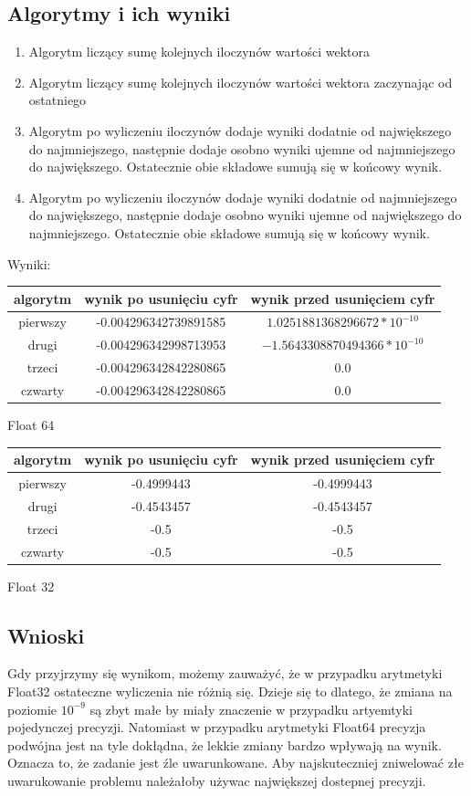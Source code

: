 \documentclass{article}
\begin{document}
\subsection{Algorytmy i ich wyniki}
\begin{enumerate}
  \item Algorytm liczący sumę kolejnych iloczynów wartości wektora
  \item Algorytm liczący sumę kolejnych iloczynów wartości wektora zaczynając od ostatniego
  \item Algorytm po wyliczeniu iloczynów dodaje wyniki dodatnie od największego do najmniejszego, następnie dodaje osobno wyniki ujemne od najmniejszego do największego. Ostatecznie obie składowe sumują się w końcowy wynik.
  \item Algorytm po wyliczeniu iloczynów dodaje wyniki dodatnie od najmniejszego do największego, następnie dodaje osobno wyniki ujemne od największego do najmniejszego. Ostatecznie obie składowe sumują się w końcowy wynik.
\end{enumerate}
Wyniki:
\begin{center}
  \begin{tabular}{c|c|c}
    algorytm & wynik po usunięciu cyfr & wynik przed usunięciem cyfr\\
    \hline
    pierwszy & -0.004296342739891585 & $1.0251881368296672 * 10^{-10}$\\
    drugi & -0.004296342998713953 & $-1.5643308870494366 * 10^{-10}$\\
    trzeci & -0.004296342842280865 & 0.0\\
    czwarty & -0.004296342842280865 & 0.0
  \end{tabular} \par
  \bigskip
  Float 64
\end{center}
\begin{center}
  \begin{tabular}{c|c|c}
    algorytm & wynik po usunięciu cyfr & wynik przed usunięciem cyfr\\
    \hline
    pierwszy & -0.4999443 & -0.4999443\\
    drugi & -0.4543457 & -0.4543457\\
    trzeci & -0.5 & -0.5\\
    czwarty & -0.5 & -0.5
  \end{tabular} \par
  \bigskip
  Float 32
\end{center}

\subsection{Wnioski}
Gdy przyjrzymy się wynikom, możemy zauważyć, że w przypadku arytmetyki Float32 ostateczne wyliczenia nie różnią się. Dzieje się to dlatego, że zmiana na poziomie $10^{-9}$ są zbyt małe by miały znaczenie w przypadku artyemtyki pojedynczej precyzji. Natomiast w przypadku arytmetyki Float64 precyzja podwójna jest na tyle dokłądna, że lekkie zmiany bardzo wpływają na wynik. Oznacza to, że zadanie jest źle uwarunkowane. Aby najskuteczniej zniwelować złe uwarukowanie problemu należałoby używac największej dostepnej precyzji. 
\end{document}
